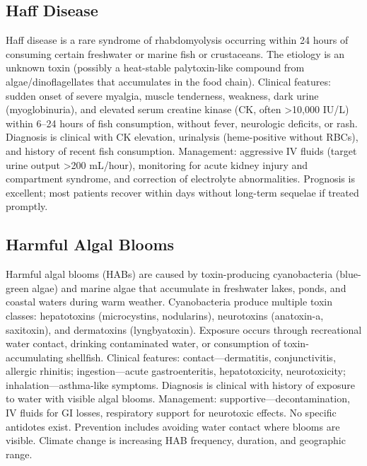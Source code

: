 \subsection{Haff Disease}
\label{sec:Haff Disease}
Haff disease is a rare syndrome of rhabdomyolysis occurring within 24 hours of consuming certain freshwater or marine fish or crustaceans. The etiology is an unknown toxin (possibly a heat-stable palytoxin-like compound from algae/dinoflagellates that accumulates in the food chain). Clinical features: sudden onset of severe myalgia, muscle tenderness, weakness, dark urine (myoglobinuria), and elevated serum creatine kinase (CK, often >10,000 IU/L) within 6--24 hours of fish consumption, without fever, neurologic deficits, or rash. Diagnosis is clinical with CK elevation, urinalysis (heme-positive without RBCs), and history of recent fish consumption. Management: aggressive IV fluids (target urine output >200 mL/hour), monitoring for acute kidney injury and compartment syndrome, and correction of electrolyte abnormalities. Prognosis is excellent; most patients recover within days without long-term sequelae if treated promptly.

\subsection{Harmful Algal Blooms}
\label{sec:Harmful Algal Blooms}
Harmful algal blooms (HABs) are caused by toxin-producing cyanobacteria (blue-green algae) and marine algae that accumulate in freshwater lakes, ponds, and coastal waters during warm weather. Cyanobacteria produce multiple toxin classes: hepatotoxins (microcystins, nodularins), neurotoxins (anatoxin-a, saxitoxin), and dermatoxins (lyngbyatoxin). Exposure occurs through recreational water contact, drinking contaminated water, or consumption of toxin-accumulating shellfish. Clinical features: contact---dermatitis, conjunctivitis, allergic rhinitis; ingestion---acute gastroenteritis, hepatotoxicity, neurotoxicity; inhalation---asthma-like symptoms. Diagnosis is clinical with history of exposure to water with visible algal blooms. Management: supportive---decontamination, IV fluids for GI losses, respiratory support for neurotoxic effects. No specific antidotes exist. Prevention includes avoiding water contact where blooms are visible. Climate change is increasing HAB frequency, duration, and geographic range.

